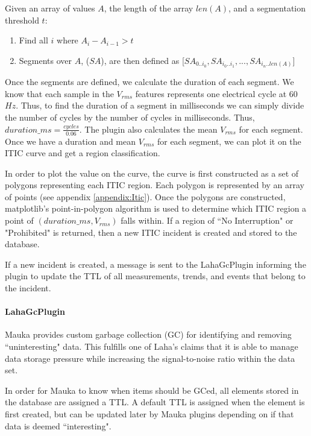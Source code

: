 Given an array of values $A$, the length of the array $len(A)$, and a segmentation threshold $t$:
\begin{enumerate}
	\item Find all $i$ where $A_i - A_{i-1} > t$
	\item Segments over $A$, ($SA$), are then defined as [$SA_{0..i_0}, SA_{i_0..i_1}, ..., SA_{i_n..len(A)}$]
\end{enumerate}

Once the segments are defined, we calculate the duration of each segment. We know that each sample in the $V_{rms}$ features represents one electrical cycle at 60$Hz$. Thus, to find the duration of a segment in milliseconds we can simply divide the number of cycles by the number of cycles in milliseconds. Thus, $duration\_ms = \frac{cycles}{0.06}$. The plugin also calculates the mean $V_{rms}$ for each segment. Once we have a duration and mean $V_{rms}$ for each segment, we can plot it on the ITIC curve and get a region classification.

In order to plot the value on the curve, the curve is first constructed as a set of polygons representing each ITIC region. Each polygon is represented by an array of points (see appendix \ref{appendix:Itic}). Once the polygons are constructed, matplotlib's point-in-polygon algorithm is used to determine which ITIC region a point of $(duration\_ms, V_{rms})$ falls within. If a region of ``No Interruption" or "Prohibited" is returned, then a new ITIC incident is created and stored to the database. 

If a new incident is created, a message is sent to the LahaGcPlugin informing the plugin to update the TTL of all measurements, trends, and events that belong to the incident. 

\paragraph{LahaGcPlugin}
Mauka provides custom garbage collection (GC) for identifying and removing ``uninteresting" data. This fulfills one of Laha's claims that it is able to manage data storage pressure while increasing the signal-to-noise ratio within the data set.

In order for Mauka to know when items should be GCed, all elements stored in the database are assigned a TTL. A default TTL is assigned when the element is first created, but can be updated later by Mauka plugins depending on if that data is deemed ``interesting".

